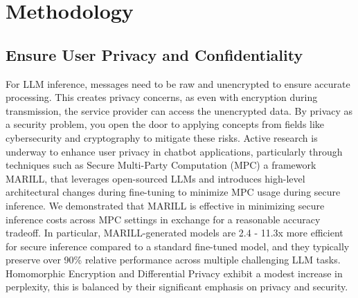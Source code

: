 \section{Methodology}
\subsection{Ensure User Privacy and Confidentiality}
For LLM inference, messages need to be raw and unencrypted to ensure accurate processing. This creates privacy concerns, as even with encryption during transmission, the service provider can access the unencrypted data. By privacy as a security problem, you open the door to applying concepts from fields like cybersecurity and cryptography to mitigate these risks. Active research is underway to enhance user privacy in chatbot applications, particularly through techniques such as Secure Multi-Party Computation (MPC) \cite{rathee2024mpc} a framework MARILL, that leverages open-sourced LLMs and introduces
high-level architectural changes during fine-tuning to minimize MPC usage during secure inference. We demonstrated that MARILL is effective in minimizing secure inference costs across MPC settings in exchange for a reasonable accuracy tradeoff. In particular, MARILL-generated models are 2.4 - 11.3x more efficient for secure inference compared to a standard fine-tuned model, and they typically preserve over 90\% relative performance across multiple challenging LLM tasks. Homomorphic Encryption \cite{kimprivacy} and Differential Privacy \cite{singh2024whispered} exhibit a modest increase in perplexity, this is balanced by their significant emphasis on privacy and security.
